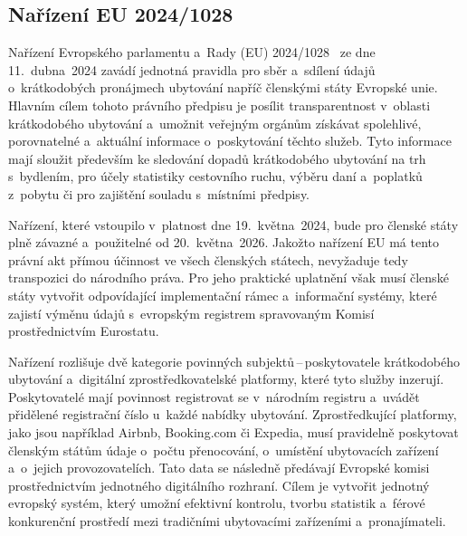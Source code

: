 \subsection{Nařízení EU 2024/1028}
Nařízení Evropského parlamentu a~Rady (EU) 2024/1028~\cite{eu-2024-1028} ze dne 11.~dubna~2024 zavádí jednotná pravidla pro sběr a~sdílení údajů o~krátkodobých pronájmech ubytování napříč členskými státy Evropské unie.
Hlavním cílem tohoto právního předpisu je posílit transparentnost v~oblasti krátkodobého ubytování a~umožnit veřejným orgánům získávat spolehlivé, porovnatelné a~aktuální informace o~poskytování těchto služeb.
Tyto informace mají sloužit především ke sledování dopadů krátkodobého ubytování na trh s~bydlením, pro účely statistiky cestovního ruchu, výběru daní a~poplatků z~pobytu či pro zajištění souladu s~místními předpisy.

Nařízení, které vstoupilo v~platnost dne 19.~května~2024, bude pro členské státy plně závazné a~použitelné od 20.~května~2026.
Jakožto nařízení EU má tento právní akt přímou účinnost ve všech členských státech, nevyžaduje tedy transpozici do národního práva.
Pro jeho praktické uplatnění však musí členské státy vytvořit odpovídající implementační rámec a~informační systémy, které zajistí výměnu údajů s~evropským registrem spravovaným Komisí prostřednictvím Eurostatu.

Nařízení rozlišuje dvě kategorie povinných subjektů\,--\,poskytovatele krátkodobého ubytování a~digitální zprostředkovatelské platformy, které tyto služby inzerují.
Poskytovatelé mají povinnost registrovat se v~národním registru a~uvádět přidělené registrační číslo u~každé nabídky ubytování.
Zprostředkující platformy, jako jsou například Airbnb, Booking.com či Expedia, musí pravidelně poskytovat členským státům údaje o~počtu přenocování, o~umístění ubytovacích zařízení a~o~jejich provozovatelích.
Tato data se následně předávají Evropské komisi prostřednictvím jednotného digitálního rozhraní.
Cílem je vytvořit jednotný evropský systém, který umožní efektivní kontrolu, tvorbu statistik a~férové konkurenční prostředí mezi tradičními ubytovacími zařízeními a~pronajímateli.

